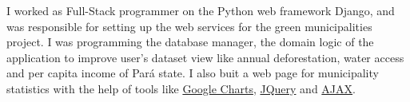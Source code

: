 \documentclass[]{joaosoares-resume}
\begin{document}
\begin{minipage}[t]{0.64\textwidth}
\sectionsep

\sectionsep 

{\justifying \noindent I worked as Full-Stack programmer on the Python web framework Django, and was responsible for setting up the web services for the green municipalities project. I was programming the database manager, the domain logic of the application to improve user’s dataset view like annual deforestation, water access and per capita income of Pará state. I also buit a web page for municipality statistics with the help of tools like \href{https://developers.google.com/chart}{Google Charts}, \href{http://plugins.jquery.com}{JQuery} and  \href{https://api.jquery.com/category/ajax}{AJAX}.\par}

\sectionsep

\end{minipage} 
\end{document}
